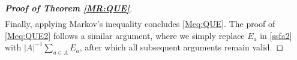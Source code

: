 \begin{proof}[\bf Proof of Theorem \ref{MR:QUE}]
\begin{align*}
\end{align*}
Finally, applying Markov's inequality concludes \eqref{Meq:QUE}. The proof of \eqref{Meq:QUE2} follows a similar argument, where we simply replace $E_{a}$ in \eqref{ssfa2} with $|A|^{-1}\sum_{a\in A} E_{a}$, after which all subsequent arguments remain valid.  
\end{proof}
  
 
